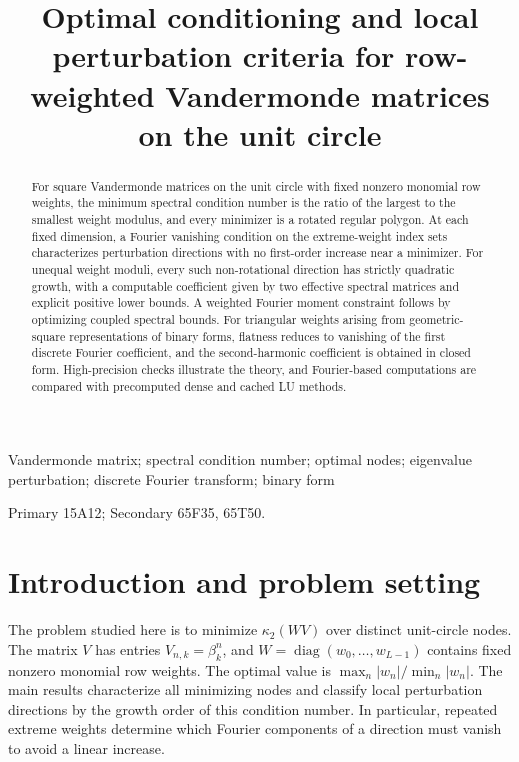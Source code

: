 \documentclass[10pt,twoside,final]{siamart1116}
\numberwithin{equation}{section}
\numberwithin{theorem}{section}
\newcommand{\diag}{\operatorname{diag}}
\newcommand{\cond}{\kappa_2}
\begin{document}
\title{Optimal conditioning and local perturbation criteria for
row-weighted Vandermonde matrices on the unit circle}
\author{%
\mbox{}
}
%
\maketitle

\begin{abstract}
For square Vandermonde matrices on the unit circle with fixed nonzero monomial
row weights, the minimum spectral condition number is the ratio of the largest
to the smallest weight modulus, and every minimizer is a rotated regular polygon.
At each fixed dimension, a Fourier vanishing condition on the extreme-weight index sets
characterizes perturbation directions with no first-order increase near a minimizer. For unequal weight
moduli, every such non-rotational direction has strictly quadratic growth, with
a computable coefficient given by two effective spectral matrices and explicit
positive lower bounds. A weighted Fourier moment constraint follows by optimizing
coupled spectral bounds. For triangular weights arising from geometric-square
representations of binary forms, flatness reduces to vanishing of the first
discrete Fourier coefficient, and the second-harmonic coefficient is obtained
in closed form.
High-precision checks illustrate the theory, and Fourier-based computations are
compared with precomputed dense and cached LU methods.
\end{abstract}

\begin{keywords}
Vandermonde matrix; spectral condition number; optimal nodes;
eigenvalue perturbation; discrete Fourier transform; binary form
\end{keywords}

\begin{AMS}
Primary 15A12; Secondary 65F35, 65T50.
\end{AMS}

\section{Introduction and problem setting}\label{sec:intro}

The problem studied here is to minimize $\cond(WV)$ over distinct unit-circle
nodes. The matrix $V$ has entries $V_{n,k}=\beta_k^n$, and
$W=\diag(w_0,\ldots,w_{L-1})$ contains fixed nonzero monomial row weights.
The optimal value is
$\max_n|w_n|/\min_n|w_n|$. The main results characterize all minimizing nodes and
classify local perturbation directions by the growth order of this condition number.
In particular, repeated extreme weights determine which Fourier components of a
direction must vanish to avoid a linear increase.
\end{document}
